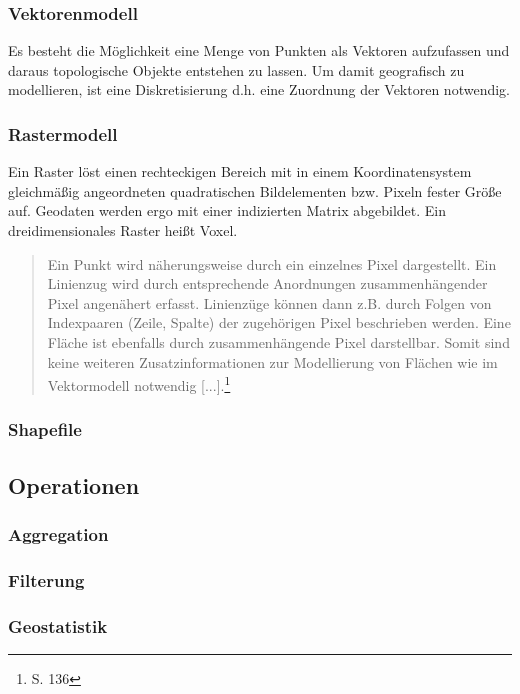 \subsubsection{Vektorenmodell}

Es besteht die Möglichkeit eine Menge von Punkten als Vektoren aufzufassen und daraus topologische Objekte entstehen zu lassen.
Um damit geografisch zu modellieren, ist eine Diskretisierung d.h. eine Zuordnung der Vektoren notwendig. 

\subsubsection{Rastermodell}

Ein Raster löst einen rechteckigen Bereich mit in einem Koordinatensystem gleichmäßig angeordneten quadratischen Bildelementen bzw. Pixeln fester Größe auf.
Geodaten werden ergo mit einer indizierten Matrix abgebildet.
Ein dreidimensionales Raster heißt Voxel.
\begin{quote}
Ein Punkt wird näherungsweise durch ein einzelnes Pixel dargestellt. Ein Linienzug wird durch entsprechende Anordnungen zusammenhängender Pixel angenähert erfasst. Linienzüge können dann z.B. durch Folgen von Indexpaaren (Zeile, Spalte) der zugehörigen Pixel beschrieben werden. Eine Fläche ist ebenfalls durch zusammenhängende Pixel darstellbar. Somit sind keine weiteren Zusatzinformationen zur Modellierung von Flächen wie im Vektormodell notwendig [...].\footnote{\cite{book:gi-theopluspraxis3} S. 136}
\end{quote}


\subsubsection{Shapefile}

\subsection{Operationen}

\subsubsection{Aggregation}

\subsubsection{Filterung}

\subsubsection{Geostatistik}

